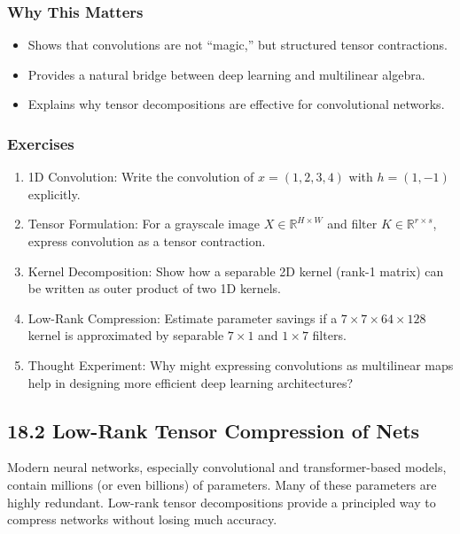 \documentclass[
  letterpaper,
  DIV=11,
  numbers=noendperiod]{scrreprt}
\providecommand{\tightlist}{%
  \setlength{\itemsep}{0pt}\setlength{\parskip}{0pt}}
\begin{document}
\subsubsection{Why This Matters}\label{why-this-matters-48}

\begin{itemize}
\tightlist
\item
  Shows that convolutions are not ``magic,'' but structured tensor
  contractions.
\item
  Provides a natural bridge between deep learning and multilinear
  algebra.
\item
  Explains why tensor decompositions are effective for convolutional
  networks.
\end{itemize}

\subsubsection{Exercises}\label{exercises-62}

\begin{enumerate}
\def\labelenumi{\arabic{enumi}.}
\item
  1D Convolution: Write the convolution of \(x = (1,2,3,4)\) with
  \(h = (1,-1)\) explicitly.
\item
  Tensor Formulation: For a grayscale image
  \(X \in \mathbb{R}^{H \times W}\) and filter
  \(K \in \mathbb{R}^{r \times s}\), express convolution as a tensor
  contraction.
\item
  Kernel Decomposition: Show how a separable 2D kernel (rank-1 matrix)
  can be written as outer product of two 1D kernels.
\item
  Low-Rank Compression: Estimate parameter savings if a
  \(7 \times 7 \times 64 \times 128\) kernel is approximated by
  separable \(7 \times 1\) and \(1 \times 7\) filters.
\item
  Thought Experiment: Why might expressing convolutions as multilinear
  maps help in designing more efficient deep learning architectures?
\end{enumerate}

\subsection{18.2 Low-Rank Tensor Compression of
Nets}\label{low-rank-tensor-compression-of-nets}

Modern neural networks, especially convolutional and transformer-based
models, contain millions (or even billions) of parameters. Many of these
parameters are highly redundant. Low-rank tensor decompositions provide
a principled way to compress networks without losing much accuracy.
\end{document}
